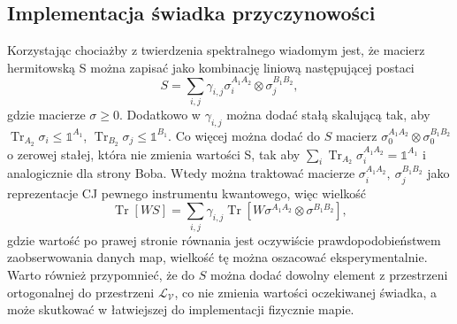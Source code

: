 \documentclass[10pt]{article} %
\DeclareMathOperator{\Trs}{Tr}
\newcommand{\I}{\mathbb{1}}
\begin{document}
\subsection{Implementacja świadka przyczynowości}
Korzystając chociażby z twierdzenia spektralnego wiadomym jest, że macierz hermitowską S można zapisać jako kombinację liniową następującej postaci
\begin{equation}
S = \sum_{i,j} \gamma_{i,j} \sigma^{A_1A_2}_i \otimes \sigma^{B_1B_2}_j,
\end{equation} gdzie macierze $\sigma \geq 0$. Dodatkowo w $\gamma_{i,j}$ można dodać stałą skalującą tak, aby $\Trs_{A_2} \sigma_i \leq \I^{A_1}$, $\Trs_{B_2} \sigma_j \leq \I^{B_1}$.
Co więcej można dodać do $S$ macierz $\sigma_0^{A_1A_2} \otimes \sigma_0^{B_1B_2}$ o zerowej stałej, która nie zmienia wartości S, tak aby $\sum_i \Trs_{A_2} \sigma^{A_1A_2}_i = \I^{A_1}$ i analogicznie dla strony Boba. Wtedy można traktować macierze $\sigma^{A_1A_2}_i,~ \sigma^{B_1B_2}_j$ jako reprezentacje CJ pewnego instrumentu kwantowego, więc wielkość
\begin{equation}
\Trs \left[ W S \right] = \sum_{i,j} \gamma_{i,j} \Trs\left[ W \sigma^{A_1A_2} \otimes \sigma^{B_1B_2} \right],
\end{equation} gdzie wartość po prawej stronie równania jest oczywiście prawdopodobieństwem zaobserwowania danych map, wielkość tę można oszacować eksperymentalnie.
Warto również przypomnieć, że do $S$ można dodać dowolny element z przestrzeni ortogonalnej do przestrzeni $\mathcal{L_V}$, co nie zmienia wartości oczekiwanej świadka, a może skutkować w łatwiejszej do implementacji fizycznie mapie. 
\end{document}
